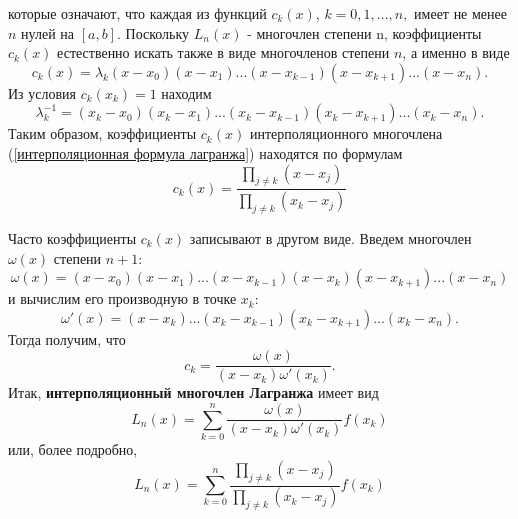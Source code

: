 которые означают, что каждая из функций $c_k(x)$, $k=0,1,...,n,$ имеет не менее $n$ нулей на $[a,b]$. Поскольку $L_n(x)$ - многочлен степени n, коэффициенты $c_k(x)$ естественно искать также в виде многочленов степени $n$, а именно в виде
\begin{equation*}
    c_k(x) = \lambda_k(x-x_0)(x-x_1)...(x-x_{k-1})(x-x_{k+1})...(x-x_n).
\end{equation*}
Из условия $c_k(x_k)=1$ находим
\begin{equation*}
    \lambda_k^{-1}=(x_k-x_0)(x_k-x_1)...(x_k-x_{k-1})(x_k-x_{k+1})...(x_k-x_n).
\end{equation*}
Таким образом, коэффициенты $c_k(x)$ интерполяционного многочлена (\ref{интерполяционная формула лагранжа}) находятся по формулам
\begin{equation*}
    c_k(x) = \frac{\displaystyle \prod_{j \neq k}(x-x_j)}{\displaystyle \prod_{j \neq k}(x_k-x_j)}
\end{equation*}

Часто коэффициенты $c_k(x)$ записывают в другом виде. Введем многочлен $\omega(x)$ степени $n+1$:
\begin{equation*}
    \omega(x) = (x-x_0)(x-x_1)...(x-x_{k-1})(x-x_k)(x-x_{k+1})...(x-x_n)
\end{equation*}
и вычислим его производную в точке $x_k$:
\begin{equation*}
    \omega '(x) = (x-x_k)...(x_k - x_{k-1})(x_k-x_{k+1})...(x_k-x_n).
\end{equation*}
Тогда получим, что
\begin{equation*}
    c_k = \frac{\omega (x)}{(x-x_k)\omega ' (x_k)}.
\end{equation*}
Итак, \textbf{интерполяционный многочлен Лагранжа} имеет вид
\begin{equation*}
    L_n(x) = \displaystyle \sum_{k=0}^{n} \frac{\omega(x)}{(x-x_k)\omega ' (x_k)} f(x_k)
\end{equation*}
или, более подробно,
\begin{equation*}
    L_n(x) = \displaystyle \sum_{k=0}^{n} \frac{\displaystyle \prod_{j \neq k}(x-x_j)}{\displaystyle \prod_{j \neq k}(x_k-x_j)} f(x_k)
\end{equation*}

